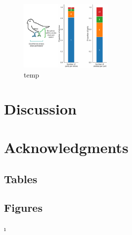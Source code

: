 \documentclass[10pt,letterpaper]{article}
\begin{document}
\begin{figure}
\centering
\includegraphics[width=0.4\textwidth]{figures/stroke_part_relationship.pdf}
\caption{temp}
\label{figg}
\end{figure}



\section{Discussion}

\section{Acknowledgments}

\subsection{Tables}

\subsection{Figures}




\setlength{\bibleftmargin}{.125in}
\setlength{\bibindent}{-\bibleftmargin}ı
\end{document}
